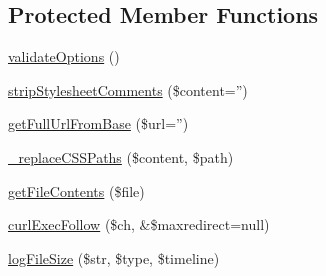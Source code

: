 \subsection*{Protected Member Functions}
\begin{DoxyCompactItemize}
\item 
\hyperlink{class_js_css_chunker_af67fb6c6a578eefd672d15653d6cc4ac}{validateOptions} ()
\item 
\hyperlink{class_js_css_chunker_ae12731eb9a0feb5cffa1f7e75d6f1725}{stripStylesheetComments} (\$content='')
\item 
\hyperlink{class_js_css_chunker_a26b1287f34ee59445195a9ef0211fc61}{getFullUrlFromBase} (\$url='')
\item 
\hyperlink{class_js_css_chunker_ab2b04d4425ee5e03ac52dcf5bffce611}{\_\-replaceCSSPaths} (\$content, \$path)
\item 
\hyperlink{class_js_css_chunker_a6faf7f9b77a8c591bf7933591edd5fcb}{getFileContents} (\$file)
\item 
\hyperlink{class_js_css_chunker_a409b2e58a3b844cf7b7689b4ef319462}{curlExecFollow} (\$ch, \&\$maxredirect=null)
\item 
\hyperlink{class_js_css_chunker_aa6371d126eb4968c6c9dfa97182f649a}{logFileSize} (\$str, \$type, \$timeline)
\end{DoxyCompactItemize}
